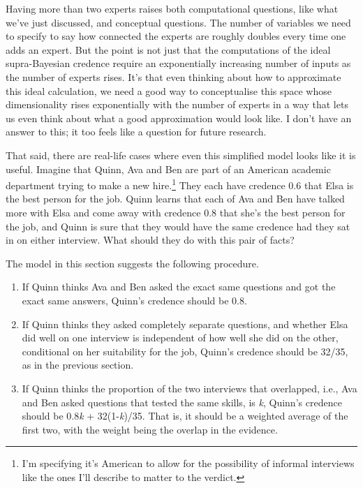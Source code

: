 \documentclass[
  11pt,
  letterpaper,
  DIV=11,
  numbers=noendperiod,
  twoside]{scrartcl}
\providecommand{\tightlist}{%
  \setlength{\itemsep}{0pt}\setlength{\parskip}{0pt}}
\begin{document}
Having more than two experts raises both computational questions, like
what we've just discussed, and conceptual questions. The number of
variables we need to specify to say how connected the experts are
roughly doubles every time one adds an expert. But the point is not just
that the computations of the ideal supra-Bayesian credence require an
exponentially increasing number of inputs as the number of experts
rises. It's that even thinking about how to approximate this ideal
calculation, we need a good way to conceptualise this space whose
dimensionality rises exponentially with the number of experts in a way
that lets us even think about what a good approximation would look like.
I don't have an answer to this; it too feels like a question for future
research.

That said, there are real-life cases where even this simplified model
looks like it is useful. Imagine that Quinn, Ava and Ben are part of an
American academic department trying to make a new hire.\footnote{I'm
  specifying it's American to allow for the possibility of informal
  interviews like the ones I'll describe to matter to the verdict.} They
each have credence 0.6 that Elsa is the best person for the job. Quinn
learns that each of Ava and Ben have talked more with Elsa and come away
with credence 0.8 that she's the best person for the job, and Quinn is
sure that they would have the same credence had they sat in on either
interview. What should they do with this pair of facts?

The model in this section suggests the following procedure.

\begin{enumerate}
\def\labelenumi{\arabic{enumi}.}
\tightlist
\item
  If Quinn thinks Ava and Ben asked the exact same questions and got the
  exact same answers, Quinn's credence should be 0.8.
\item
  If Quinn thinks they asked completely separate questions, and whether
  Elsa did well on one interview is independent of how well she did on
  the other, conditional on her suitability for the job, Quinn's
  credence should be 32/35, as in the previous section.
\item
  If Quinn thinks the proportion of the two interviews that overlapped,
  i.e., Ava and Ben asked questions that tested the same skills, is
  \emph{k}, Quinn's credence should be 0.8\emph{k} + 32(1-\emph{k})/35.
  That is, it should be a weighted average of the first two, with the
  weight being the overlap in the evidence.
\end{enumerate}
\end{document}
